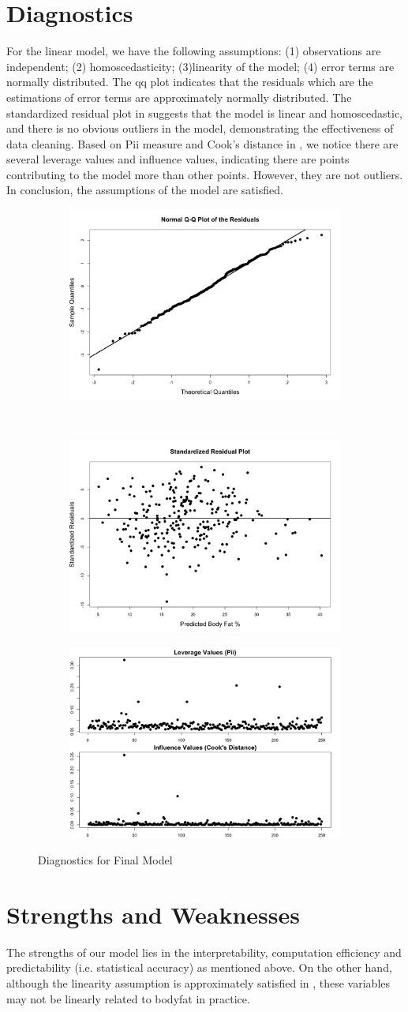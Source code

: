 \documentclass[11pt, letterpaper]{article}
\begin{document}
\section{Diagnostics}
\label{sec:diag}
For the linear model, we have the following assumptions: (1) observations are independent; (2) homoscedasticity; (3)linearity of the model; (4) error terms are normally distributed. The qq plot  indicates that the residuals which are the estimations of error terms are approximately normally distributed. The standardized residual plot in  suggests that the model is linear and homoscedastic, and there is no obvious outliers in the model, demonstrating the effectiveness of data cleaning. Based on Pii measure and Cook's distance in , we notice there are several leverage values and influence values, indicating there are points contributing to the model more than other points. However, they are not outliers. In conclusion, the assumptions of the model are satisfied. 
\begin{figure}
	\centering
	\label{fig:2}
	\begin{subfigure}
		\centering
		\includegraphics[width=.2\linewidth]{../Image/qq_plot.png}
	\end{subfigure}%
~
	\begin{subfigure}
		\centering
		\includegraphics[width=.2\linewidth]{../Image/Final_Model_Residual_Plot.png}
	\end{subfigure}
	\begin{subfigure}
	\centering
	\includegraphics[width=.3\linewidth]{../Image/Pii_Cook's_Distance.png}
\end{subfigure}
	\caption{Diagnostics for Final Model}
\end{figure}
\section{Strengths and Weaknesses}
\label{sec:str}
The strengths of our model lies in the interpretability, computation efficiency and predictability (i.e. statistical accuracy) as mentioned above. On the other hand, although the linearity assumption is approximately satisfied in , these variables may not be linearly related to bodyfat in practice. 
\end{document}
